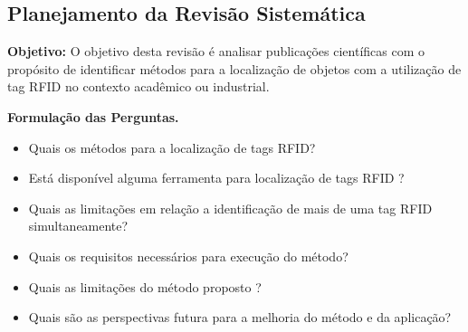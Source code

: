 		\subsection{ Planejamento da Revisão Sistemática}
			\par
\textbf{Objetivo: }O objetivo desta revisão é analisar publicações científicas com o propósito de  identificar métodos para a localização de objetos com a utilização de tag RFID no contexto acadêmico ou industrial.
			
            \par
            \textbf{Formulação das Perguntas.}
            
            \begin{itemize}
              \item Quais os métodos para a localização de tags RFID?
              \item Está disponível alguma ferramenta para localização de tags RFID ?
              \item Quais as limitações em relação a identificação de mais de uma tag RFID simultaneamente?
              \item Quais os requisitos necessários para execução do método?
              \item Quais as limitações do método proposto ?
              \item Quais são as perspectivas futura para a melhoria do método e da aplicação?

            \end{itemize}
			
